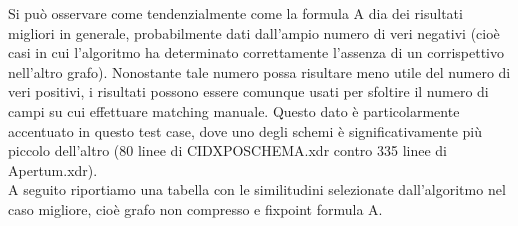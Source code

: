 \documentclass{article}
\begin{document}
\begin{center}
\end{center}

Si può osservare come tendenzialmente come la formula A dia dei risultati migliori in generale, probabilmente dati dall'ampio numero di veri negativi (cioè casi in cui l'algoritmo ha determinato correttamente l'assenza di un corrispettivo nell'altro grafo). Nonostante tale numero possa risultare meno utile del numero di veri positivi, i risultati possono essere comunque usati per sfoltire il numero di campi su cui effettuare matching manuale. Questo dato è particolarmente accentuato in questo test case, dove uno degli schemi è significativamente più piccolo dell'altro (80 linee di CIDXPOSCHEMA.xdr contro 335 linee di Apertum.xdr).\\

A seguito riportiamo una tabella con le similitudini selezionate dall’algoritmo nel caso migliore, cioè grafo non compresso e fixpoint formula A.
\end{document}
